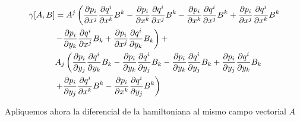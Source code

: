 \documentclass[a4paper,10pt]{article}
\numberwithin{equation}{section}
\newcommand{\zerodel}{.\kern-\nulldelimiterspace}
\begin{document}
\begin{align}
\begin{split}
 \gamma[A,B] &= A^j\left(\frac{\partial p_i}{\partial x^j}\frac{\partial q^i}{\partial x^k}B^k
 - \frac{\partial p_i}{\partial x^k}\frac{\partial q^i}{\partial x^j}B^k
 - \frac{\partial p_i}{\partial x^k}\frac{\partial q^i}{\partial x^j}B^k
 + \frac{\partial p_i}{\partial x^j}\frac{\partial q^i}{\partial x^k}B^k\right\zerodel \\
 &\left\zerodel-\frac{\partial p_i}{\partial y_k}\frac{\partial q^i}{\partial x^j}B_k
 +\frac{\partial p_i}{\partial x^j}\frac{\partial q^i}{\partial y_k}B_k\right) + \\
 &A_j\left( \frac{\partial p_i}{\partial y_j}\frac{\partial q^i}{\partial y_k}B_k - 
  \frac{\partial p_i}{\partial y_k}\frac{\partial q^i}{\partial y_j}B_k
  - \frac{\partial p_i}{\partial y_k}\frac{\partial q^i}{\partial y_j}B_k 
  +\frac{\partial p_i}{\partial y_j}\frac{\partial q^i}{\partial y_k}B_k \right\zerodel \\
  &\left\zerodel + \frac{\partial p_i}{\partial y_j}\frac{\partial q^i}{\partial x^k}B^k
  - \frac{\partial p_i}{\partial x^k}\frac{\partial q^i}{\partial y_j}B^k\right)
  \label{eq:Hamilton1}
\end{split}
\end{align}

Apliquemos ahora la diferencial de la hamiltoniana al mismo campo vectorial $A$

% 
% 
\end{document}
